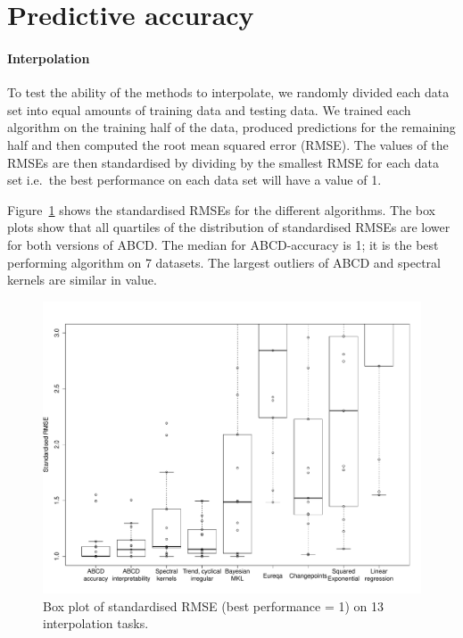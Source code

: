 \documentclass[letterpaper]{article}
\def\ie{i.e.\ }
\newcommand{\procedurename}{ABCD}
\begin{document}
\section{Predictive accuracy}

\paragraph{Interpolation}

To test the ability of the methods to interpolate, we randomly divided each data set into equal amounts of training data and testing data.
We trained each algorithm on the training half of the data, produced predictions for the remaining half and then computed the root mean squared error (RMSE).
The values of the RMSEs are then standardised by dividing by the smallest RMSE for each data set \ie the best performance on each data set will have a value of 1.

Figure~\ref{fig:box_interp} shows the standardised RMSEs for the different algorithms.
The box plots show that all quartiles of the distribution of standardised RMSEs are lower for both versions of \procedurename{}.
The median for \procedurename{}-accuracy is 1; it is the best performing algorithm on 7 datasets.
The largest outliers of \procedurename{} and spectral kernels are similar in value.

\begin{figure}[ht]
\centering
\includegraphics[width=\textwidth]{figures/box_interp}
\caption{
Box plot of standardised RMSE (best performance = 1) on 13 interpolation tasks.
}
\label{fig:box_interp}
\end{figure}
\end{document}
